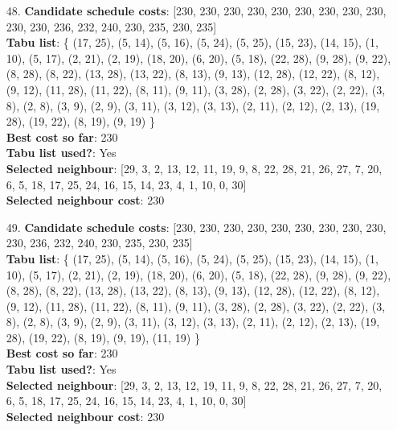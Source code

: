 \documentclass[fleqn]{article}
\begin{document}
\begin{itemize}
    \item[48.] \textbf{Candidate schedule costs}: [230, 230, 230, 230, 230, 230, 230, 230, 230, 230, 230, 236, 232, 240, 230, 235, 230, 235] \\
    \textbf{Tabu list}: \{ (17, 25), (5, 14), (5, 16), (5, 24), (5, 25), (15, 23), (14, 15), (1, 10), (5, 17), (2, 21), (2, 19), (18, 20), (6, 20), (5, 18), (22, 28), (9, 28), (9, 22), (8, 28), (8, 22), (13, 28), (13, 22), (8, 13), (9, 13), (12, 28), (12, 22), (8, 12), (9, 12), (11, 28), (11, 22), (8, 11), (9, 11), (3, 28), (2, 28), (3, 22), (2, 22), (3, 8), (2, 8), (3, 9), (2, 9), (3, 11), (3, 12), (3, 13), (2, 11), (2, 12), (2, 13), (19, 28), (19, 22), (8, 19), (9, 19) \} \\
    \textbf{Best cost so far}: 230 \\
    \textbf{Tabu list used?}: Yes \\
    \textbf{Selected neighbour}: [29, 3, 2, 13, 12, 11, 19, 9, 8, 22, 28, 21, 26, 27, 7, 20, 6, 5, 18, 17, 25, 24, 16, 15, 14, 23, 4, 1, 10, 0, 30] \\
    \textbf{Selected neighbour cost}: 230
      

    \item[49.] \textbf{Candidate schedule costs}: [230, 230, 230, 230, 230, 230, 230, 230, 230, 230, 236, 232, 240, 230, 235, 230, 235] \\
    \textbf{Tabu list}: \{ (17, 25), (5, 14), (5, 16), (5, 24), (5, 25), (15, 23), (14, 15), (1, 10), (5, 17), (2, 21), (2, 19), (18, 20), (6, 20), (5, 18), (22, 28), (9, 28), (9, 22), (8, 28), (8, 22), (13, 28), (13, 22), (8, 13), (9, 13), (12, 28), (12, 22), (8, 12), (9, 12), (11, 28), (11, 22), (8, 11), (9, 11), (3, 28), (2, 28), (3, 22), (2, 22), (3, 8), (2, 8), (3, 9), (2, 9), (3, 11), (3, 12), (3, 13), (2, 11), (2, 12), (2, 13), (19, 28), (19, 22), (8, 19), (9, 19), (11, 19) \} \\
    \textbf{Best cost so far}: 230 \\
    \textbf{Tabu list used?}: Yes \\
    \textbf{Selected neighbour}: [29, 3, 2, 13, 12, 19, 11, 9, 8, 22, 28, 21, 26, 27, 7, 20, 6, 5, 18, 17, 25, 24, 16, 15, 14, 23, 4, 1, 10, 0, 30] \\
    \textbf{Selected neighbour cost}: 230
      


\end{itemize}
\end{document}
